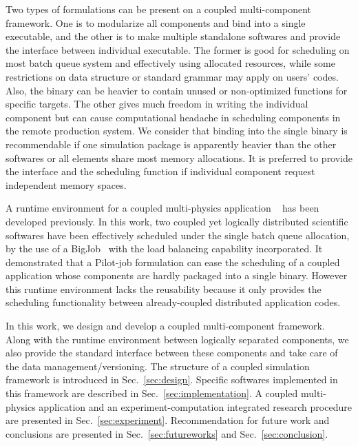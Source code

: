 \documentclass[10pt,conference]{IEEEtran}
\begin{document}
Two types of formulations can be present on a coupled multi-component 
framework. One is to modularize all components and bind into
a single executable, and the other is to make multiple standalone softwares
and provide the interface between individual executable. 
The former is good for scheduling on most batch queue system and 
effectively using allocated resources, while some restrictions 
on data structure or standard grammar may apply on users' codes.
Also, the binary can be heavier to contain unused or non-optimized functions
for specific targets. The other gives much freedom in writing 
the individual component but can cause computational headache in scheduling
components in the remote production system.
We consider that binding into the single binary is recommendable if
one simulation package is apparently heavier than the other softwares or
all elements share most memory allocations. It is preferred to provide
the interface and the scheduling function if individual component request
independent memory spaces.

A runtime environment for a coupled multi-physics application
~\cite{CCGrid_Hybrid} has been developed previously. In this work,
two coupled yet logically distributed scientific softwares have been
effectively scheduled under the single batch queue allocation, 
by the use of a BigJob~\cite{saga_royalsoc} with the load balancing
capability incorporated. It demonstrated that a Pilot-job formulation
can ease the scheduling of a coupled application whose components are
hardly packaged into a single binary. However this runtime environment
lacks the reusability because it only provides the scheduling functionality
between already-coupled distributed application codes.

In this work, we design and develop a coupled multi-component framework.
Along with the runtime environment between logically separated components,
we also provide the standard interface between these components and
take care of the data management/versioning. The structure of
a coupled simulation framework is introduced in Sec.~\ref{sec:design}.
Specific softwares implemented in this framework are described in
Sec.~\ref{sec:implementation}. A coupled multi-physics application and
an experiment-computation integrated research procedure are presented
in Sec.~\ref{sec:experiment}. Recommendation for future work and 
conclusions are presented in Sec.~\ref{sec:futureworks} and
Sec.~\ref{sec:conclusion}.
\end{document}
